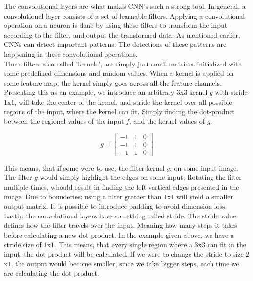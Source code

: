 The convolutional layers are what makes CNN's such a strong tool. In general, a convolutional layer consists of a set of learnable filters. Applying a convolutional operation on a neuron is done by using these filters to transform the input according to the filter, and output the transformed data. As mentioned earlier, CNNs can detect important patterns. The detections of these patterns are happening in these convolutional operations.\\

\noindent
These filters also called 'kernels', are simply just small matrixes initialized with some predefined dimensions and random values. When a kernel is applied on some feature map, the kernel simply goes across all the feature-channels.\\

\noindent
Presenting this as an example, we introduce an arbitrary $3$x$3$ kernel $g$ with stride $1$x$1$, will take the center of the kernel, and stride the kernel over all possible regions of the input, where the kernel can fit. Simply finding the dot-product between the regional values of the input $f$, and the kernel values of $g$.

$$ g = \begin{bmatrix}
-1 & 1 & 0 \\
-1 & 1 & 0 \\
-1 & 1 & 0
\end{bmatrix}
$$

\noindent
This means, that if some were to use, the filter kernel $g$, on some input image. The filter $g$ would simply highlight the edges on some input; Rotating the filter multiple times, whould result in finding the left vertical edges presented in the image. Due to bounderies; using a filter greater than $1$x$1$ will yield a smaller output matrix. It is possible to introduce padding to avoid dimension loss.\\

\noindent
Lastly, the convolutional layers have something called stride. The stride value defines how the filter travels over the input. Meaning how many steps it takes before calculating a new dot-product. In the example given above, we have a stride size of $1$x$1$. This means, that every single region where a $3$x$3$ can fit in the input, the dot-product will be calculated. If we were to change the stride to size $2$x$1$, the output would become smaller, since we take bigger steps, each time we are calculating the dot-product.

